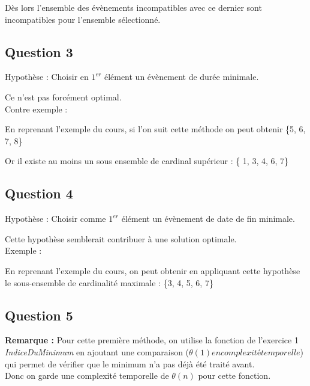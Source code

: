 \documentclass{article}
\begin{document}
Dès lors l'ensemble des évènements incompatibles avec ce dernier sont incompatibles pour l'ensemble sélectionné. 

\subsection*{Question 3}

Hypothèse : Choisir en $1^{er}$ élément un évènement de durée minimale.

Ce n'est pas forcément optimal. 
\\
Contre exemple : 

En reprenant l'exemple du cours, si l'on suit cette méthode on peut obtenir \{5, 6, 7, 8\}

Or il existe au moins un sous ensemble de cardinal supérieur : \{ 1, 3, 4, 6, 7\}

\subsection*{Question 4}

Hypothèse : Choisir comme $1^{er}$ élément un évènement de date de fin minimale. 

Cette hypothèse semblerait contribuer à une solution optimale. 
\\
Exemple : 

En reprenant l'exemple du cours, on peut obtenir en appliquant cette hypothèse le sous-ensemble de cardinalité maximale : \{3, 4, 5, 6, 7\}

\subsection*{Question 5}

\textbf{Remarque :}
Pour cette première méthode, on utilise la fonction de l'exercice 1 \textit{IndiceDuMinimum} en ajoutant une comparaison ($ \theta (1) en complexité temporelle $) qui permet de vérifier que le minimum n'a pas déjà été traité avant.
\\ 
Donc on garde une complexité temporelle de $ \theta(n) $ pour cette fonction. 
\end{document}
